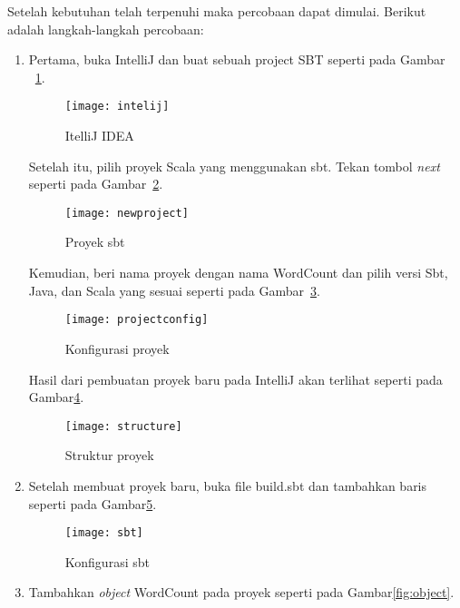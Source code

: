 Setelah kebutuhan telah terpenuhi maka percobaan dapat dimulai. Berikut adalah langkah-langkah percobaan:

\begin{enumerate}

\item Pertama, buka IntelliJ dan buat sebuah project SBT seperti pada Gambar ~\ref{fig:intelij}.

\begin{figure}[H]
    \centering  
    \texttt{[image: intelij]}  
    \caption[ItelliJ IDEA]{ItelliJ IDEA} 
    \label{fig:intelij} 
\end{figure}

Setelah itu, pilih proyek Scala yang menggunakan sbt. Tekan tombol \textit{next} seperti pada Gambar~\ref{fig:newproject}.

\begin{figure}[H]
    \centering  
    \texttt{[image: newproject]}  
    \caption[Proyek sbt]{Proyek sbt} 
    \label{fig:newproject} 
\end{figure}

Kemudian, beri nama proyek dengan nama WordCount dan pilih versi Sbt, Java, dan Scala yang sesuai seperti pada Gambar~\ref{fig:projectconfig}. 

\begin{figure}[H]
    \centering  
    \texttt{[image: projectconfig]}  
    \caption[Konfigurasi proyek]{Konfigurasi proyek} 
    \label{fig:projectconfig} 
\end{figure}

Hasil dari pembuatan proyek baru pada IntelliJ akan terlihat seperti pada Gambar\ref{fig:structure}.

\begin{figure}[H]
    \centering  
    \texttt{[image: structure]}  
    \caption[Struktur proyek ]{Struktur proyek} 
    \label{fig:structure} 
\end{figure}

\item Setelah membuat proyek baru, buka file build.sbt dan tambahkan baris seperti pada Gambar\ref{fig:sbt}.


\begin{figure}[H]
    \centering  
    \texttt{[image: sbt]}  
    \caption[Konfigurasi sbt]{Konfigurasi sbt} 
    \label{fig:sbt} 
\end{figure}

\item Tambahkan \textit{object} WordCount pada proyek seperti pada Gambar\ref{fig:object}.


\end{enumerate}
